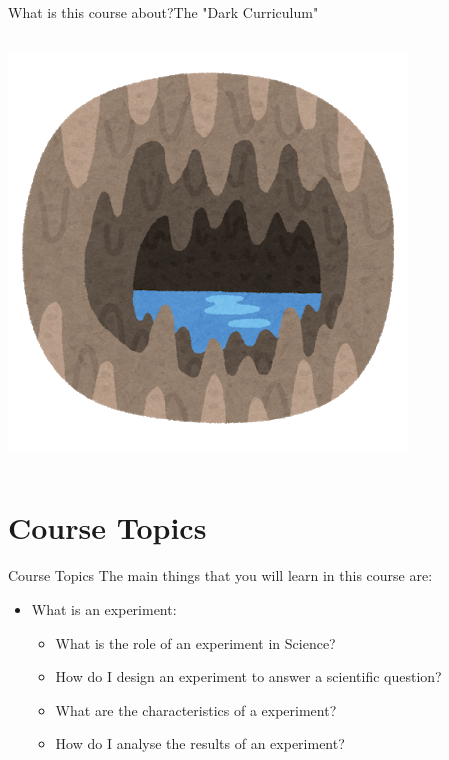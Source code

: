 \documentclass[aspectratio=169]{beamer}
\begin{document}
\begin{CJK}{UTF8}{ipxm}
\begin{frame}{What is this course about?}{The "Dark Curriculum"}
\begin{columns}
    \includegraphics[width=1\textwidth]{../img/irasutoya_cave}
  \end{columns}
  \bigskip

\end{frame}

\section{Course Topics}
\begin{frame}{Course Topics}
  The main things that you will learn in this course are:\bigskip

  \begin{itemize}
    \item What is an experiment:
    \begin{itemize}
      \item What is the role of an experiment in Science?
      \item How do I design an experiment to answer a scientific question?
      \item What are the characteristics of a  experiment?
      \item How do I analyse the results of an experiment?
    \end{itemize}\bigskip


\end{itemize}
\end{frame}
\end{CJK}
\end{document}
